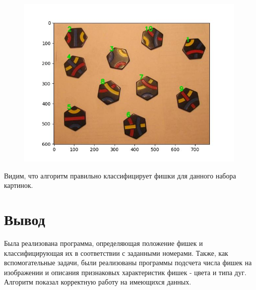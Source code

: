 \documentclass[a4paper, 12pt]{article}
\begin{document}
 \begin{figure}[H]
        	\centering
        	\includegraphics[width=1\linewidth]{test_2.jpg}
        	\label{fig:mpr_7}
        	\vspace{-25pt}
        	\caption{}
\end{figure}

Видим, что алгоритм правильно классифицирует фишки для данного набора картинок.


\section{Вывод}
    Была реализована программа, определяющая положение фишек и классифицирующая их в соответствии с заданными номерами.  Также, как вспомогательные задачи, были реализованы программы подсчета числа фишек на изображении и описания признаковых характеристик фишек - цвета и типа дуг. Алгоритм показал корректную работу на имеющихся данных.
\end{document}
